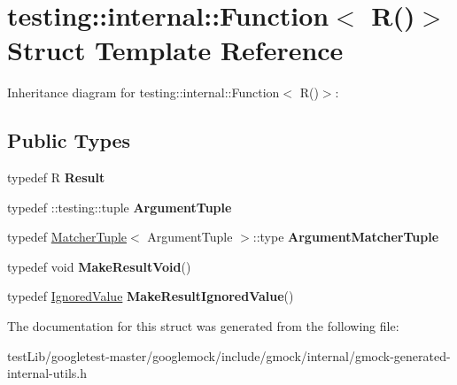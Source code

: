 \hypertarget{structtesting_1_1internal_1_1Function_3_01R_07_08_4}{}\section{testing\+:\+:internal\+:\+:Function$<$ R()$>$ Struct Template Reference}
\label{structtesting_1_1internal_1_1Function_3_01R_07_08_4}


Inheritance diagram for testing\+:\+:internal\+:\+:Function$<$ R()$>$\+:
\subsection*{Public Types}
\begin{DoxyCompactItemize}
\item 
\mbox{\label{structtesting_1_1internal_1_1Function_3_01R_07_08_4_a5c228a886ef598ac10988f8de5e32ca1}} 
typedef R {\bfseries Result}
\item 
\mbox{\label{structtesting_1_1internal_1_1Function_3_01R_07_08_4_ad483c3128c470d8cdb55c3ac1c575c11}} 
typedef \+::testing\+::tuple {\bfseries Argument\+Tuple}
\item 
\mbox{\label{structtesting_1_1internal_1_1Function_3_01R_07_08_4_a9bec5cf8937e8af99dedab2f40129fab}} 
typedef \hyperlink{structtesting_1_1internal_1_1MatcherTuple}{Matcher\+Tuple}$<$ Argument\+Tuple $>$\+::type {\bfseries Argument\+Matcher\+Tuple}
\item 
\mbox{\label{structtesting_1_1internal_1_1Function_3_01R_07_08_4_a666b5ad3bf155529d3a0f9fe6d5c897b}} 
typedef void {\bfseries Make\+Result\+Void}()
\item 
\mbox{\label{structtesting_1_1internal_1_1Function_3_01R_07_08_4_aa459093a5b52ef54e2544b5a6c054383}} 
typedef \hyperlink{classtesting_1_1internal_1_1IgnoredValue}{Ignored\+Value} {\bfseries Make\+Result\+Ignored\+Value}()
\end{DoxyCompactItemize}


The documentation for this struct was generated from the following file\+:\begin{DoxyCompactItemize}
\item 
test\+Lib/googletest-\/master/googlemock/include/gmock/internal/gmock-\/generated-\/internal-\/utils.\+h\end{DoxyCompactItemize}

